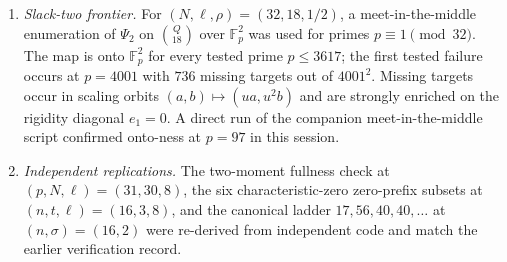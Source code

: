\documentclass[11pt]{article}
\theoremstyle{definition}
\newcommand{\F}{\mathbb F}
\begin{document}
\begin{enumerate}[label=V\arabic*.,leftmargin=2.4em]
\item\emph{Slack-two frontier.}  For $(N,\ell,\rho)=(32,18,1/2)$, a meet-in-the-middle enumeration of $\Psi_2$ on $\binom Q{18}$ over $\F_p^2$ was used for primes $p\equiv1\pmod{32}$.  The map is onto $\F_p^2$ for every tested prime $p\le3617$; the first tested failure occurs at $p=4001$ with $736$ missing targets out of $4001^2$.  Missing targets occur in scaling orbits $(a,b)\mapsto(ua,u^2b)$ and are strongly enriched on the rigidity diagonal $e_1=0$.  A direct run of the companion meet-in-the-middle script confirmed onto-ness at $p=97$ in this session.
\item\emph{Independent replications.}  The two-moment fullness check at $(p,N,\ell)=(31,30,8)$, the six characteristic-zero zero-prefix subsets at $(n,t,\ell)=(16,3,8)$, and the canonical ladder $17,56,40,40,\ldots$ at $(n,\sigma)=(16,2)$ were re-derived from independent code and match the earlier verification record.
\end{enumerate}
\end{document}
